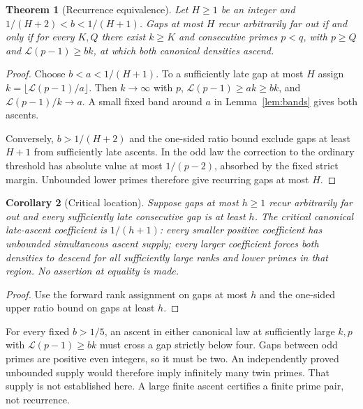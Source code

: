 \documentclass[11pt]{article}
\newtheorem{theorem}{Theorem}[section]
\newtheorem{corollary}[theorem]{Corollary}
\theoremstyle{definition}
\newcommand{\LL}{\mathcal L}
\begin{document}
\begin{theorem}[Recurrence equivalence]\label{thm:late}
Let $H\ge1$ be an integer and
$1/(H+2)<b<1/(H+1)$. Gaps at most $H$ recur arbitrarily far out
if and only if for every $K,Q$ there exist $k\ge K$ and consecutive
primes $p<q$, with $p\ge Q$ and $\LL(p-1)\ge bk$, at which both
canonical densities ascend.
\end{theorem}
\begin{proof}
Choose $b<a<1/(H+1)$. To a sufficiently late gap at most $H$
assign $k=\lfloor\LL(p-1)/a\rfloor$. Then $k\to\infty$ with $p$,
$\LL(p-1)\ge ak\ge bk$, and $\LL(p-1)/k\to a$.
A small fixed band around $a$ in Lemma~\ref{lem:bands} gives
both ascents.

Conversely, $b>1/(H+2)$ and the one-sided ratio bound exclude
gaps at least $H+1$ from sufficiently late ascents. In the odd
law the correction to the ordinary threshold has absolute value
at most $1/(p-2)$, absorbed by the fixed strict margin.
Unbounded lower primes therefore give recurring gaps at most $H$.
\end{proof}

\begin{corollary}[Critical location]\label{cor:critical}
Suppose gaps at most $h\ge1$ recur arbitrarily far out and every
sufficiently late consecutive gap is at least $h$. The critical
canonical late-ascent coefficient is $1/(h+1)$: every smaller
positive coefficient has unbounded simultaneous ascent supply;
every larger coefficient forces both densities to descend for
all sufficiently large ranks and lower primes in that region.
No assertion at equality is made.
\end{corollary}
\begin{proof}
Use the forward rank assignment on gaps at most $h$ and the
one-sided upper ratio bound on gaps at least $h$.
\end{proof}

For every fixed $b>1/5$, an ascent in either canonical law at
sufficiently large $k,p$ with $\LL(p-1)\ge bk$ must cross a gap
strictly below four. Gaps between odd primes are positive even
integers, so it must be two. An independently proved unbounded
supply would therefore imply infinitely many twin primes.
That supply is not established here. A large finite ascent
certifies a finite prime pair, not recurrence.
\end{document}
